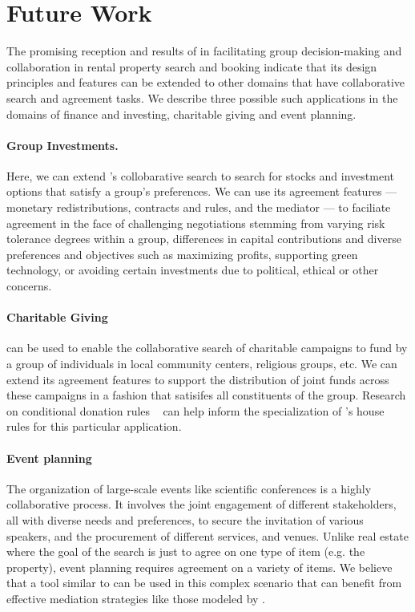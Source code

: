 \section{Future Work}
The promising reception and results of \tool in facilitating group decision-making and collaboration in rental property search and booking indicate that its design principles and features can be extended to other domains that have collaborative search and agreement tasks. We describe three possible such applications in the domains of finance and investing, charitable giving and 
event planning.

\paragraph{Group Investments.} Here, we can extend \tool's collobarative search to search for stocks and investment options that satisfy a group's preferences. We can use its agreement features --- monetary redistributions, contracts and rules, and the \cbot mediator --- to faciliate agreement in the face of challenging negotiations stemming from varying risk tolerance degrees within a group, differences in capital contributions and diverse preferences and objectives such as maximizing profits, supporting green technology, or avoiding certain investments due to political, ethical or other concerns.

\paragraph{Charitable Giving} \tool can be used to enable the collaborative search of charitable campaigns to fund by a group of individuals in local community centers, religious groups, etc. We can extend its agreement features to support the distribution of joint funds across these campaigns in a fashion that satisifes all constituents of the group. Research on conditional donation rules ~\cite{codo} can help inform the specialization of \tool's house rules for this particular application. 


\paragraph{Event planning} The organization of large-scale events like scientific conferences is a highly collaborative process. It involves the joint engagement of different stakeholders, all with diverse needs and preferences, to secure the invitation of various speakers, and the procurement of different services, and venues. Unlike real estate where the goal of the search is just to agree on one type of item (e.g. the property), event planning requires agreement on a variety of items. We believe that a tool similar to \tool can be used in this complex scenario that can benefit from effective mediation strategies like those modeled by \cbot. 



